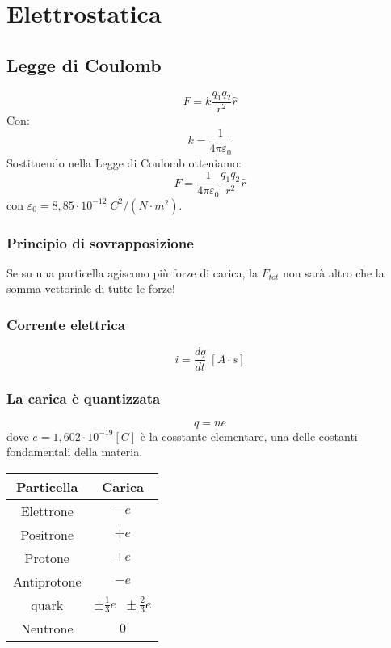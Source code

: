 \chapter*{Elettrostatica}

    \section*{Legge di Coulomb}
        \begin{equation*}
            F = k\frac{q_1q_2}{r^2}\widehat{r}
        \end{equation*}
    Con:
    \begin{equation*}
        k = \frac{1}{4\pi\varepsilon_0}
    \end{equation*}
    Sostituendo nella Legge di Coulomb otteniamo:
    \begin{equation*}
        F = \frac{1}{4\pi\varepsilon_0}\frac{q_1q_2}{r^2}\widehat{r}
    \end{equation*}
    con $\varepsilon_0 = 8,85\cdot 10^{-12}\;C^2/(N\cdot m^2)$.
        \subsection*{Principio di sovrapposizione}
        Se su una particella agiscono più forze di carica, la $F_{tot}$ non 
        sarà altro che la somma vettoriale di tutte le forze!

        \subsection*{Corrente elettrica}
            \begin{equation*}
                i = \frac{dq}{dt} \; [A \cdot s]
            \end{equation*}
    
        \subsection*{La carica è quantizzata} 
            \begin{equation*}
                q = ne
            \end{equation*}
        dove $e = 1,602\cdot10^{-19} [C]$ è la cosstante elementare, una delle
        costanti fondamentali della materia.
        \begin{center}
            \begin{tabular}{ |c|c| } 
                \hline
                Particella & Carica \\
                \hline
                Elettrone & $- e$ \\
                Positrone & $+ e$ \\
                Protone & $+ e$ \\
                Antiprotone & $- e$ \\
                quark & $\pm \frac{1}{3}e \;\; \pm \frac{2}{3}e$ \\
                Neutrone & $0$ \\
                \hline
            \end{tabular}
        \end{center}

